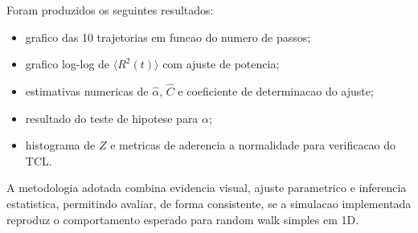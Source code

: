 Foram produzidos os seguintes resultados:
\begin{itemize}
    \item grafico das 10 trajetorias em funcao do numero de passos;
    \item grafico log-log de $\langle R^2(t)\rangle$ com ajuste de potencia;
    \item estimativas numericas de $\hat{\alpha}$, $\hat{C}$ e coeficiente de determinacao do ajuste;
    \item resultado do teste de hipotese para $\alpha$;
    \item histograma de $Z$ e metricas de aderencia a normalidade para verificacao do TCL.
\end{itemize}

A metodologia adotada combina evidencia visual, ajuste parametrico e inferencia estatistica, permitindo avaliar, de forma consistente, se a simulacao implementada reproduz o comportamento esperado para random walk simples em 1D.
